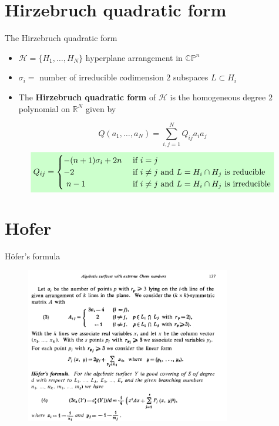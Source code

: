 \documentclass{beamer}
\newcommand{\R}{\mathbb{R}}
\newcommand{\CP}{\mathbb{CP}}
\newcommand{\mH}{\mathcal{H}}
\newcommand{\mathcolorbox}[2]{\colorbox{#1}{$\displaystyle #2$}}
\begin{document}
\section{Hirzebruch quadratic form}
\begin{frame}{The Hirzebruch quadratic form}
	\begin{itemize}
		\item \(\mH = \{H_1, \ldots, H_N\}\) hyperplane arrangement in \(\CP^n\)
		\item \(\sigma_i = \) number of irreducible codimension \(2\) subspaces \(L \subset H_i\)
		\item The \textbf{Hirzebruch quadratic form} of \(\mH\) is the homogeneous degree \(2\) polynomial on \(\R^N\) given by
	\end{itemize}
	\[
	Q(a_1, \ldots, a_N) = \sum_{i,j = 1}^N Q_{ij} a_i a_j 
	\]
	\[
	\mathcolorbox{green!20}{
	Q_{ij} = \begin{cases}
		- (n+1) \sigma_i + 2n &\text{ if } i = j  \\
		-2 &\text{ if }  i \neq j \text{ and } L = H_i \cap H_j \text{ is reducible} \\
		\,\, n-1 &\text{ if } i \neq j \text{ and } L = H_i \cap H_j \text{ is irreducible} 
	\end{cases}
}
	\]
\end{frame}

\section{Hofer}
\begin{frame}{H\"ofer's formula}
	\begin{center}
		\begin{figure}
			\includegraphics[width=0.8\textwidth,height=0.8\textheight,keepaspectratio]{hofer}
		\end{figure}
	\end{center}
\end{frame}
\end{document}
